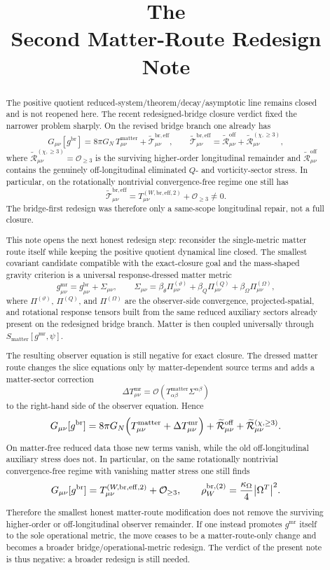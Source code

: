 \documentclass[11pt]{article}
\title{\textbf{The \TheoryName{}}\\[0.4em]
\large Second Matter-Route Redesign Note}
\author{}
\date{}
\newcommand{\PiTheta}{\Pi^{(\vartheta)}}
\newcommand{\PiQ}{\Pi^{(Q)}}
\newcommand{\PiOmega}{\Pi^{(\Omega)}}
\newcommand{\MatterMetric}{g^{\mathrm{mr}}}
\newcommand{\SigmaMR}{\Sigma}
\newcommand{\ReEff}{\widetilde{\mathcal T}_{\mu\nu}^{\mathrm{br,eff}}}
\newcommand{\ReLong}{\widetilde{\mathcal R}_{\mu\nu}^{(\chi,\ge 3)}}
\newcommand{\ReOff}{\widetilde{\mathcal R}_{\mu\nu}^{\mathrm{off}}}
\newcommand{\DeltaTM}{\Delta T_{\mu\nu}^{\mathrm{mr}}}
\begin{document}
\maketitle

\begin{abstract}
The positive quotient reduced-system/theorem/decay/asymptotic line remains closed and is not reopened here. The recent redesigned-bridge closure verdict fixed the narrower problem sharply. On the revised bridge branch one already has
\[
G_{\mu\nu}[g^{\mathrm{br}}]
=
8\pi G_N\,T_{\mu\nu}^{\mathrm{matter}}
+\ReEff,
\qquad
\ReEff=\ReOff+\ReLong,
\]
where \(\ReLong=\mathcal O_{\ge 3}\) is the surviving higher-order longitudinal remainder and \(\ReOff\) contains the genuinely off-longitudinal eliminated \(Q\)- and vorticity-sector stress. In particular, on the rotationally nontrivial convergence-free regime one still has
\[
\ReEff
=
T_{\mu\nu}^{(W,\mathrm{br,eff},2)}
+\mathcal O_{\ge 3}
\neq 0.
\]
The bridge-first redesign was therefore only a same-scope longitudinal repair, not a full closure.

This note opens the next honest redesign step: reconsider the single-metric matter route itself while keeping the positive quotient dynamical line closed. The smallest covariant candidate compatible with the exact-closure goal and the mass-shaped gravity criterion is a universal response-dressed matter metric
\[
\MatterMetric_{\mu\nu}
=
g^{\mathrm{br}}_{\mu\nu}
+\SigmaMR_{\mu\nu},
\qquad
\SigmaMR_{\mu\nu}
=
\beta_\theta \PiTheta_{\mu\nu}
+\beta_Q \PiQ_{\mu\nu}
+\beta_\Omega \PiOmega_{\mu\nu},
\]
where \(\PiTheta\), \(\PiQ\), and \(\PiOmega\) are the observer-side convergence, projected-spatial, and rotational response tensors built from the same reduced auxiliary sectors already present on the redesigned bridge branch. Matter is then coupled universally through \(S_{\mathrm{matter}}[\MatterMetric,\psi]\).

The resulting observer equation is still negative for exact closure. The dressed matter route changes the slice equations only by matter-dependent source terms and adds a matter-sector correction
\[
\DeltaTM
=
\mathcal O\!\left(T_{\alpha\beta}^{\mathrm{matter}}\SigmaMR^{\alpha\beta}\right)
\]
to the right-hand side of the observer equation. Hence
\[
G_{\mu\nu}[g^{\mathrm{br}}]
=
8\pi G_N\Bigl(T_{\mu\nu}^{\mathrm{matter}}+\DeltaTM\Bigr)
+\ReOff+\ReLong.
\]
On matter-free reduced data those new terms vanish, while the old off-longitudinal auxiliary stress does not. In particular, on the same rotationally nontrivial convergence-free regime with vanishing matter stress one still finds
\[
G_{\mu\nu}[g^{\mathrm{br}}]
=
T_{\mu\nu}^{(W,\mathrm{br,eff},2)}
+\mathcal O_{\ge 3},
\qquad
\rho_W^{\mathrm{br},(2)}
=
\frac{\kappa_\Omega}{4}\abs{\Omega^T}^2.
\]
Therefore the smallest honest matter-route modification does not remove the surviving higher-order or off-longitudinal observer remainder. If one instead promotes \(\MatterMetric\) itself to the sole operational metric, the move ceases to be a matter-route-only change and becomes a broader bridge/operational-metric redesign. The verdict of the present note is thus negative: a broader redesign is still needed.
\end{abstract}
\end{document}
